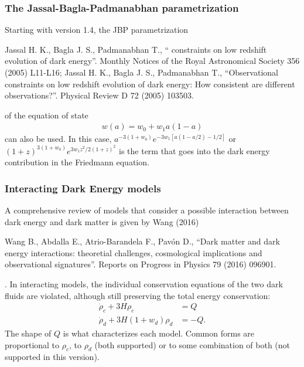 \documentclass[letterpaper,12pt,english]{sphinxhowto}
\begin{document}
\subsubsection{The Jassal-Bagla-Padmanabhan parametrization}
\label{\detokenize{themodels:the-jassal-bagla-padmanabhan-parametrization}}
Starting with version 1.4, the JBP parametrization %
\begin{footnote}[4]\sphinxAtStartFootnote
Jassal H. K., Bagla J. S., Padmanabhan T., “ constraints on low redshift evolution of dark energy”. Monthly Notices of the Royal Astronomical Society 356 (2005) L11-L16; Jassal H. K., Bagla J. S., Padmanabhan T., “Observational constraints on low redshift evolution of dark energy: How consistent are different observations?”. Physical Review D 72 (2005) 103503.
%
\end{footnote} of the equation of state
\begin{equation*}
\begin{split}w(a) = w_0 + w_1 a (1-a)\end{split}
\end{equation*}
can also be used.
In this case, \(a^{-3\left(1 + w_0\right)} e^{- 3 w_1 \left[a\left(1 - a/2\right) - 1/2\right]}\)
or \((1+z)^{3\left(1+w_0\right)} e^{3 w_1 z^2/2 \left(1+z\right)^2}\)
is the
term that goes into the dark energy contribution in the Friedmann equation.


\subsubsection{Interacting Dark Energy models}
\label{\detokenize{themodels:int-models}}\label{\detokenize{themodels:interacting-dark-energy-models}}
A comprehensive review of models that consider a possible interaction between
dark energy and dark matter is given by Wang  (2016) %
\begin{footnote}[5]\sphinxAtStartFootnote
Wang B., Abdalla E., Atrio-Barandela F., Pavón D., “Dark matter and dark energy interactions: theoretial challenges, cosmological implications and observational signatures”. Reports on Progress in Physics 79 (2016) 096901.
%
\end{footnote}.
In interacting models, the individual conservation equations of the two dark
fluids are violated, although still preserving the total energy conservation:
\begin{equation*}
\begin{split}\dot\rho_c + 3 H \rho_c &= Q \\
\dot\rho_d + 3 H (1 + w_d) \rho_d &= -Q.\end{split}
\end{equation*}
The shape of \(Q\) is what characterizes each model. Common forms are
proportional to \(\rho_c\), to \(\rho_d\) (both supported) or to some
combination of both (not supported in this version).
\end{document}
